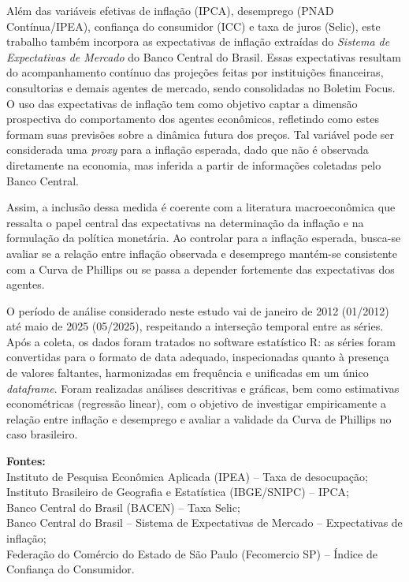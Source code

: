 \documentclass[12pt,oneside]{abntex2}
\begin{document}
Além das variáveis efetivas de inflação (IPCA), desemprego (PNAD Contínua/IPEA), confiança do consumidor (ICC) e taxa de juros (Selic), este trabalho também incorpora as expectativas de inflação extraídas do \textit{Sistema de Expectativas de Mercado} do Banco Central do Brasil. Essas expectativas resultam do acompanhamento contínuo das projeções feitas por instituições financeiras, consultorias e demais agentes de mercado, sendo consolidadas no Boletim Focus. O uso das expectativas de inflação tem como objetivo captar a dimensão prospectiva do comportamento dos agentes econômicos, refletindo como estes formam suas previsões sobre a dinâmica futura dos preços. Tal variável pode ser considerada uma \textit{proxy} para a inflação esperada, dado que não é observada diretamente na economia, mas inferida a partir de informações coletadas pelo Banco Central.

Assim, a inclusão dessa medida é coerente com a literatura macroeconômica que ressalta o papel central das expectativas na determinação da inflação e na formulação da política monetária. Ao controlar para a inflação esperada, busca-se avaliar se a relação entre inflação observada e desemprego mantém-se consistente com a Curva de Phillips ou se passa a depender fortemente das expectativas dos agentes.

\medskip

O período de análise considerado neste estudo vai de janeiro de 2012 (01/2012) até maio de 2025 (05/2025), respeitando a interseção temporal entre as séries. Após a coleta, os dados foram tratados no software estatístico R: as séries foram convertidas para o formato de data adequado, inspecionadas quanto à presença de valores faltantes, harmonizadas em frequência e unificadas em um único \textit{dataframe}. Foram realizadas análises descritivas e gráficas, bem como estimativas econométricas (regressão linear), com o objetivo de investigar empiricamente a relação entre inflação e desemprego e avaliar a validade da Curva de Phillips no caso brasileiro.

\medskip
\noindent \textbf{Fontes:} \\
Instituto de Pesquisa Econômica Aplicada (IPEA) – Taxa de desocupação; \\
Instituto Brasileiro de Geografia e Estatística (IBGE/SNIPC) – IPCA; \\
Banco Central do Brasil (BACEN) – Taxa Selic; \\
Banco Central do Brasil – Sistema de Expectativas de Mercado – Expectativas de inflação; \\
Federação do Comércio do Estado de São Paulo (Fecomercio SP) – Índice de Confiança do Consumidor. \\
\end{document}
